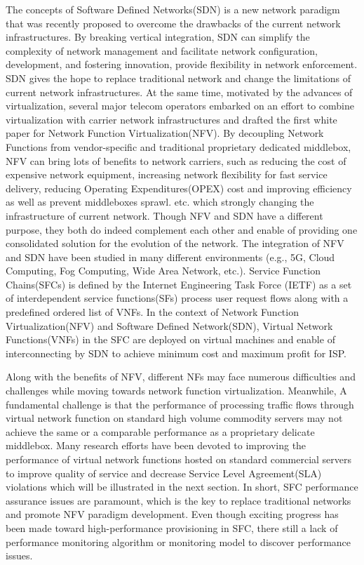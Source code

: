 \documentclass{ieeeaccess}
\begin{document}
The concepts of Software Defined Networks(SDN)\cite{b1} is a new network paradigm that was recently proposed to overcome the drawbacks of the current network infrastructures. By breaking vertical integration, SDN can simplify the complexity of network management and facilitate network configuration, development, and fostering innovation, provide flexibility in network enforcement\cite{b3}. SDN gives the hope to replace traditional network and change the limitations of current network infrastructures. At the same time, motivated by the advances of virtualization, several major telecom operators embarked on an effort to combine virtualization with carrier network infrastructures and drafted the first white paper for Network Function Virtualization(NFV)\cite{b2}. By decoupling Network Functions from vendor-specific and traditional proprietary dedicated middlebox, NFV can bring lots of benefits to network carriers, such as reducing the cost of expensive network equipment\cite{b4}, increasing network flexibility for fast service delivery\cite{b5}, reducing Operating Expenditures(OPEX)\cite{b6} cost and improving efficiency as well as prevent middleboxes sprawl. etc. which strongly changing the infrastructure of current network. Though NFV and SDN have a different purpose, they both do indeed complement each other and enable of providing one consolidated solution for the evolution of the network\cite{b7}. The integration of NFV and SDN have been studied in many different environments (e.g., 5G, Cloud Computing, Fog Computing, Wide Area Network, etc.). Service Function Chains(SFCs)\cite{b9} is defined by the Internet Engineering Task Force (IETF) as a set of interdependent service functions(SFs) process user request flows along with a predefined ordered list of VNFs. In the context of Network Function Virtualization(NFV) and Software Defined Network(SDN), Virtual Network Functions(VNFs) in the SFC are deployed on virtual machines and enable of interconnecting by SDN to achieve minimum cost and maximum profit for ISP.

Along with the benefits of NFV, different NFs may face numerous difficulties and challenges while moving towards network function virtualization. Meanwhile, A fundamental challenge is that the performance of processing traffic flows through virtual network function on standard high volume commodity servers may not achieve the same or a comparable performance as a proprietary delicate middlebox. Many research efforts have been devoted to improving the performance of virtual network functions hosted on standard commercial servers to improve quality of service and decrease Service Level Agreement(SLA) violations which will be illustrated in the next section. In short, SFC performance assurance issues are paramount, which is the key to replace traditional networks and promote NFV paradigm development. Even though exciting progress has been made toward high-performance provisioning in SFC, there still a lack of performance monitoring algorithm or monitoring model to discover performance issues.
\end{document}

